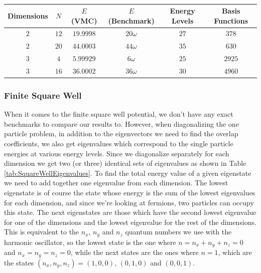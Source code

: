 \documentclass[../main.tex]{subfiles}
\begin{document}
\begin{table}[!ht]
  \centering
  \begin{tabular}{ | c | c | c | c | c | c | }
    \hline
    Dimensions & $N$ & $E$ (VMC) & $E$ (Benchmark) &  Energy Levels & Basis Functions\\*
    \hline
    $2$ & $12$ & $19.9998$ & $20\omega$ & $27$ & $378$ \\*
    \hline
    $2$ & $20$ & $44.0003$ & $44\omega$ & $35$ & $630$ \\*
    \hline
    $3$ & $4$ & $5.99929$ & $6\omega$ & $25$ & $2925$ \\*
    \hline
    $3$ & $16$ & $36.0002$ & $36\omega$ & $30$ & $4960$ \\*
    \hline
  \end{tabular}
  \caption{}
  \label{tab:DoubleHOTestCorrected}
\end{table}

\subsubsection{Finite Square Well}\label{sec: FSW_vmc_test}

When it comes to the finite square well potential, we don't have any exact benchmarks to compare our results to. However, when diagonalizing the one particle problem, in addition to the eigenvectors we need to find the overlap coefficients, we also get eigenvalues which correspond to the single particle energies at various energy levels. Since we diagonalize separately for each dimension we get two (or three) identical sets of eigenvalues as shown in Table \ref{tab:SquareWellEigenvalues}. To find the total energy value of a given eigenstate we need to add together one eigenvalue from each dimension. The lowest eigenstate is of course the state whose energy is the sum of the lowest eigenvalues for each dimension, and since we're looking at fermions, two particles can occupy this state. The next eigenstates are those which have the second lowest eigenvalue for one of the dimensions and the lowest eigenvalue for the rest of the dimensions. This is equivalent to the $n_x$, $n_y$ and $n_z$ quantum numbers we use with the harmonic oscillator, so the lowest state is the one where $n = n_x + n_y + n_z = 0$ and $n_x=n_y=n_z=0$, while the next states are the ones where $n = 1$, which are the states $(n_x,n_y,n_z) = (1,0,0)$, $(0,1,0)$ and $(0,0,1)$.
\end{document}
